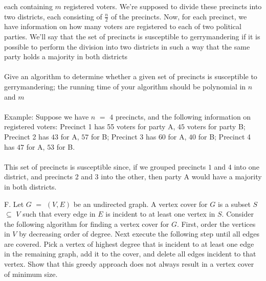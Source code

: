 \documentclass[12pt]{article}
\def\blankpage{%
      \clearpage%
      \thispagestyle{empty}%
      \addtocounter{page}{-1}%
      \null%
      \clearpage}
\begin{document}
each containing $m$ registered voters. We’re supposed to divide these precincts into two districts,
each consisting of $\frac{n}{2}$ of the precincts. Now, for each precinct, we have information
on how many voters are registered to each of two political parties. We’ll say that the set of
precincts is susceptible to gerrymandering if it is possible to perform the division into two
districts in such a way that the same party holds a majority in both districts
\\\\
Give an algorithm to determine whether a given set of precincts is susceptible to gerrymandering;
the running time of your algorithm should be polynomial in $n$ and $m$
\\\\
Example: Suppose we have $n$ $=$ $4$ precincts, and the following information on registered
voters: Precinct 1 has 55 voters for party A, $45$ voters for party B; Precinct 2 has $43$ for A,
$57$ for B; Precinct 3 has $60$ for A, $40$ for B; Precinct 4 has $47$ for A, $53$ for B.
\\\\
This set of precincts is susceptible since, if we grouped precincts $1$ and $4$ into one district,
and precincts 2 and 3 into the other, then party A would have a majority in both districts.
\blankpage
\newpage
\noindent F. Let $G$ $=$ $(V,E)$ be an undirected graph. A vertex cover for $G$ is a subset
$S$ $\subseteq$ $V$ such that every edge in $E$ is incident to at least one vertex in $S$.
Consider the following algorithm for finding a vertex cover for $G$. First,
order the vertices in $V$ by decreasing order of degree. Next execute the following
step until all edges are covered. Pick a vertex of highest degree that
is incident to at least one edge in the remaining graph, add it to the cover,
and delete all edges incident to that vertex. Show that this greedy approach
does not always result in a vertex cover of minimum size.
\end{document}

